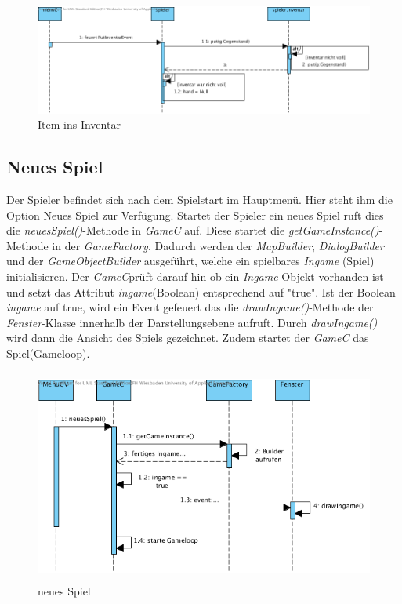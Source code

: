 \begin{figure}[h]
	\begin{center}
		\includegraphics[trim=0cm 0cm 0cm 0cm, clip=true, width=13cm]{kapitel/laufzeitsicht/itemHandInventar.png}
	\end{center}
	\caption{Item ins Inventar}
	\label{fig:inventar_uml}
\end{figure}

\subsection{Neues Spiel}
Der Spieler befindet sich nach dem Spielstart im Hauptmenü. Hier steht ihm die Option Neues Spiel zur 
Verfügung. Startet der Spieler ein neues Spiel ruft dies die \textit{neuesSpiel()}-Methode in \textit{GameC} auf. 
Diese startet die \textit{getGameInstance()}-Methode in der \textit{GameFactory}. Dadurch werden der 
\textit{MapBuilder}, \textit{DialogBuilder} und der \textit{GameObjectBuilder} ausgeführt, welche ein spielbares 
\textit{Ingame} (Spiel) initialisieren. Der \textit{GameC}prüft darauf hin ob ein \textit{Ingame}-Objekt vorhanden 
ist und setzt das Attribut \textit{ingame}(Boolean) entsprechend auf "true". 
Ist der Boolean \textit{ingame} auf true, wird ein Event gefeuert das die \textit{drawIngame()}-Methode der 
\textit{Fenster}-Klasse innerhalb der Darstellungsebene aufruft. Durch \textit{drawIngame()} wird dann die Ansicht 
des Spiels gezeichnet. Zudem startet der \textit{GameC} das Spiel(Gameloop).

\begin{figure}[h]
	\begin{center}
		\includegraphics[trim=0cm 0cm 0cm 0cm, clip=true, height=7cm]{kapitel/laufzeitsicht/neuesSpiel.png}
	\end{center}
	\caption{neues Spiel}
	\label{fig:nspiel_uml}
\end{figure}

